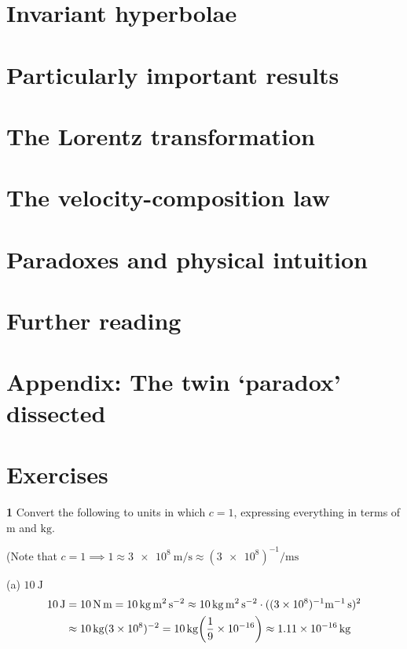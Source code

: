 \documentclass[gr-notes.tex]{subfiles}
\begin{document}
\section{Invariant hyperbolae}

\section{Particularly important results}

\section{The Lorentz transformation}

\section{The velocity-composition law}

\section{Paradoxes and physical intuition}

\section{Further reading}

\section{Appendix: The twin `paradox' dissected}

\section{Exercises}

\textbf{1}
Convert the following to units in which $c = 1$, expressing everything in terms of $\si{\meter}$ and $\si{\kilogram}$.

(Note that
$c = 1 \implies
 1 \approx \SI{3e8}{\meter\per\second}
   \approx (\num{3e8})^{-1}\si{\per\meter\second}$

(a) $\SI{10}{\joule}$
\begin{align*}
  \SI{10}{\joule} &=
  \SI{10}{\newton.\meter} =
  \SI{10}{\kilogram.\meter^2.\second^{-2}} \approx
  \SI{10}{\kilogram.\meter^2.\second^{-2}} \cdot
  ((\num{3e8})^{-1}\si{\meter^{-1}.\second})^2
  \\ &\approx
  \SI{10}{\kilogram} (\num{3e8})^{-2} =
  \SI{10}{\kilogram} \qty(\frac{1}{9} \times 10^{-16}) \approx
  \SI{1.11e-16}{\kilogram}
\end{align*}
\end{document}
